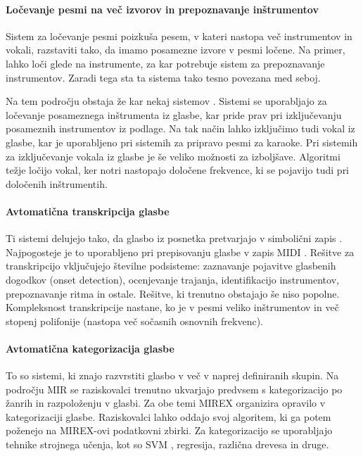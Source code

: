 \documentclass[a4paper, 12pt]{book}
\begin{document}
{\paragraph{Ločevanje pesmi na več izvorov in prepoznavanje inštrumentov}

Sistem za ločevanje pesmi poizkuša pesem, v kateri nastopa več instrumentov in vokali, razstaviti tako, da imamo posamezne izvore v pesmi ločene. Na primer, lahko loči glede na instrumente, za kar potrebuje sistem za prepoznavanje instrumentov. Zaradi tega sta ta sistema tako tesno povezana med seboj. 

Na tem področju obstaja že kar nekaj sistemov \cite{Gillet2008,  Li2007}. Sistemi se uporabljajo za ločevanje posameznega inštrumenta iz glasbe, kar pride prav pri izključevanju posameznih instrumentov iz podlage. Na tak način lahko izključimo tudi vokal iz glasbe, kar je uporabljeno pri sistemih za pripravo pesmi za karaoke. Pri sistemih za izključevanje vokala iz glasbe je še veliko možnosti za izboljšave. Algoritmi težje ločijo vokal, ker notri nastopajo določene frekvence, ki se pojavijo tudi pri določenih inštrumentih.  

\paragraph{Avtomatična transkripcija glasbe}

Ti sistemi delujejo tako, da glasbo iz posnetka pretvarjajo v simbolični zapis \cite{Gerhard, Klapuri2006, Klapuri2004}. Najpogosteje je to uporabljeno pri prepisovanju glasbe v zapis MIDI \cite{Smith1983}. Rešitve za transkripcijo vključujejo številne podsisteme: zaznavanje pojavitve glasbenih dogodkov (onset detection), ocenjevanje trajanja, identifikacijo instrumentov, prepoznavanje ritma in ostale. Rešitve, ki trenutno obstajajo še niso popolne. Kompleksnost transkripcije nastane, ko je v pesmi veliko inštrumentov in več stopenj polifonije (nastopa več sočasnih osnovnih frekvenc). 

\paragraph{Avtomatična kategorizacija glasbe}

To so sistemi, ki znajo razvrstiti glas\-bo v več v naprej definiranih skupin. Na področju MIR se raziskovalci trenutno ukvarjajo predvsem s kategorizacijo po žanrih in razpoloženju v glasbi. Za obe temi MIREX organizira opravilo v kategorizaciji glasbe. Raziskovalci lahko oddajo svoj algoritem, ki ga potem poženejo na MIREX-ovi podatkovni zbirki. Za kategorizacijo se uporabljajo tehnike strojnega učenja, kot so SVM \cite{ben2010user}, regresija, različna drevesa in druge.

}
\end{document}
